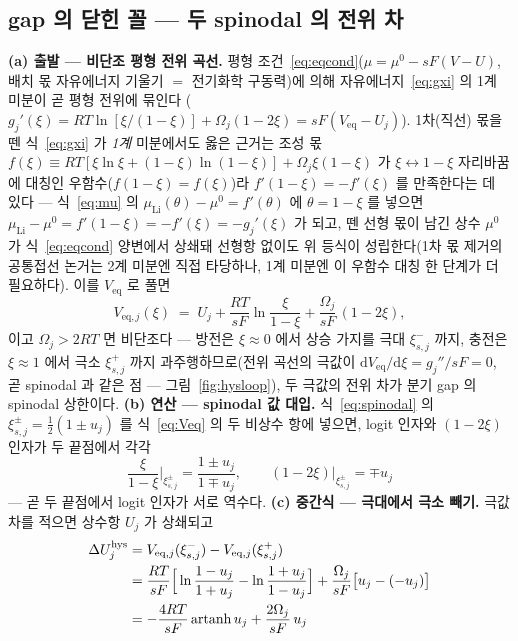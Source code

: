 \documentclass[11pt,a4paper]{article}
\newcommand{\dd}{\mathrm{d}}
\newcommand{\eq}{\mathrm{eq}}
\newcommand{\hys}{\mathrm{hys}}
\begin{document}
\subsection{gap 의 닫힌 꼴 — 두 spinodal 의 전위 차}
\textbf{(a) 출발 — 비단조 평형 전위 곡선.} 평형 조건~\eqref{eq:eqcond}($\mu=\mu^0-sF(V-U)$, 배치 몫 자유에너지 기울기 $=$ 전기화학 구동력)에 의해 자유에너지~\eqref{eq:gxi} 의 1계 미분이 곧 평형 전위에 묶인다
($g_j'(\xi)=RT\ln[\xi/(1-\xi)]+\Omega_j(1-2\xi)=sF(V_\eq-U_j)$). 1차(직선) 몫을 뗀 식~\eqref{eq:gxi} 가 \emph{1계} 미분에서도
옳은 근거는 조성 몫 $f(\xi)\equiv RT[\xi\ln\xi+(1-\xi)\ln(1-\xi)]+\Omega_j\xi(1-\xi)$ 가 $\xi\leftrightarrow1-\xi$ 자리바꿈에 대칭인
우함수($f(1-\xi)=f(\xi)$)라 $f'(1-\xi)=-f'(\xi)$ 를 만족한다는 데 있다 — 식~\eqref{eq:mu} 의 $\mu_\mathrm{Li}(\theta)-\mu^0=f'(\theta)$
에 $\theta=1-\xi$ 를 넣으면 $\mu_\mathrm{Li}-\mu^0=f'(1-\xi)=-f'(\xi)=-g_j'(\xi)$ 가 되고, 뗀 선형 몫이 남긴 상수 $\mu^0$ 가
식~\eqref{eq:eqcond} 양변에서 상쇄돼 선형항 없이도 위 등식이 성립한다(1차 몫 제거의 공통접선 논거는 2계 미분엔 직접
타당하나, 1계 미분엔 이 우함수 대칭 한 단계가 더 필요하다). 이를 $V_\eq$ 로 풀면
\begin{equation}
V_{\eq,j}(\xi)\;=\;U_j+\frac{RT}{sF}\ln\frac{\xi}{1-\xi}+\frac{\Omega_j}{sF}\,(1-2\xi),
\label{eq:Veq}
\end{equation}
이고 $\Omega_j>2RT$ 면 비단조다 — 방전은 $\xi\!\approx\!0$ 에서 상승 가지를 극대 $\xi_{s,j}^-$ 까지, 충전은 $\xi\!\approx\!1$
에서 극소 $\xi_{s,j}^+$ 까지 과주행하므로(전위 곡선의 극값이 $\dd V_\eq/\dd\xi=g_j''/sF=0$, 곧 spinodal 과 같은 점 —
그림~\ref{fig:hysloop}), 두 극값의 전위 차가 분기 gap 의 spinodal 상한이다. \textbf{(b) 연산 — spinodal 값 대입.}
식~\eqref{eq:spinodal} 의 $\xi_{s,j}^\pm=\tfrac12(1\pm u_j)$ 를 식~\eqref{eq:Veq} 의 두 비상수 항에 넣으면, logit 인자와
$(1-2\xi)$ 인자가 두 끝점에서 각각
\begin{equation}
\frac{\xi}{1-\xi}\bigg|_{\xi_{s,j}^\pm}=\frac{1\pm u_j}{1\mp u_j},
\qquad
(1-2\xi)\big|_{\xi_{s,j}^\pm}=\mp u_j
\label{eq:hyssub}
\end{equation}
— 곧 두 끝점에서 logit 인자가 서로 역수다. \textbf{(c) 중간식 — 극대에서 극소 빼기.} 극값 차를 적으면 상수항 $U_j$ 가
상쇄되고
\begin{align}
\Delta U_j^\hys
&=V_{\eq,j}(\xi_{s,j}^-)-V_{\eq,j}(\xi_{s,j}^+)\notag\\
&=\frac{RT}{sF}\Big[\ln\frac{1-u_j}{1+u_j}-\ln\frac{1+u_j}{1-u_j}\Big]
+\frac{\Omega_j}{sF}\big[u_j-(-u_j)\big]\notag\\
&=-\frac{4RT}{sF}\,\mathrm{artanh}\,u_j+\frac{2\Omega_j}{sF}\,u_j
\label{eq:hysdiff}
\end{align}
\end{document}
